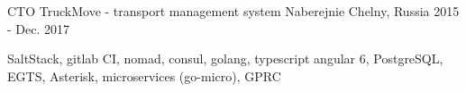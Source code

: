 \begin{cventries}
  \cventry
    {CTO} %
    {TruckMove - transport management system} %
    {Naberejnie Chelny, Russia} %
    {2015 - Dec. 2017} %
    {
      \begin{cvitems} %
        \item {SaltStack, gitlab CI, nomad, consul, golang, typescript angular 6, PostgreSQL, EGTS, Asterisk, microservices (go-micro), GPRC}
      \end{cvitems}
    }


\end{cventries}
